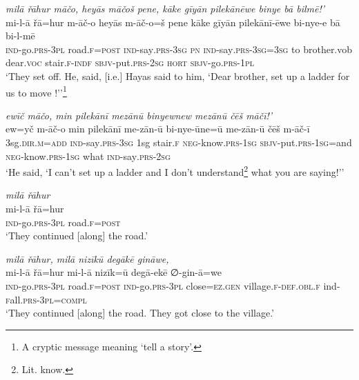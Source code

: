 \ea \label{ŽH.12}
\textit{milā řāhur māčo, heyās māčoš pene, kāke gīyān pilekānēwe binye bā bilmē!’} \\ 
\gll mi-l-ā řā=hur m-āč-o heyās m-āč-o=š pene kāke gīyān pilekānī-ēwe bi-nye-e bā bi-l-mē \\ 
 \textsc{ind-}go\textsc{.prs}\textsc{-3pl} road\textsc{\textsc{.f}}\textsc{=\textsc{post}} \textsc{ind-}say\textsc{.prs}\textsc{-3sg} \textsc{pn} \textsc{ind-}say\textsc{.prs}\textsc{-3sg}\textsc{=3sg} to brother.vob dear.\textsc{voc} stair\textsc{\textsc{.f}}\textsc{-indf} \textsc{sbjv-}put\textsc{.prs}-\textsc{2sg} \textsc{hort} \textsc{sbjv-}go\textsc{.prs}\textsc{-1pl} \\ 
\glt `They set off. He, said, [i.e.] Hayas said to him, ‘Dear brother, set up a ladder for us to move !’'\footnote{A cryptic message meaning ‘tell a story’.}
\z 
 
\ea \label{ŽH.13}
\textit{ewīč māčo, min pilekānī mezānū binyewnew mezānū čēš māčī!’} \\ 
\gll ew=yč m-āč-o min pilekānī me-zān-ū bi-nye-ūne=ū me-zān-ū čēš m-āč-ī \\ 
 3sg\textsc{.dir}\textsc{.m}\textsc{=add} \textsc{ind-}say\textsc{.prs}\textsc{-3sg} 1sg stair\textsc{\textsc{.f}} \textsc{neg-}know\textsc{.prs}\textsc{-1sg} \textsc{sbjv-}put\textsc{.prs}\textsc{-1sg}=and \textsc{neg-}know\textsc{.prs}\textsc{-1sg} what \textsc{ind-}say\textsc{.prs}-\textsc{2sg} \\ 
\glt `He said, ‘I can’t set up a ladder and I don’t understand\footnote{Lit. know.}  what you are saying!’'
\z 
 
\ea \label{ŽH.14}
\textit{milā řāhur} \\ 
\gll mi-l-ā řā=hur \\ 
 \textsc{ind-}go\textsc{.prs}\textsc{-3pl} road\textsc{\textsc{.f}}\textsc{=\textsc{post}} \\ 
\glt `They continued [along] the road.'
\z 
 
\ea \label{ŽH.15}
\textit{milā řāhur, milā nizīkū degākē gināwe,} \\ 
\gll mi-l-ā řā=hur mi-l-ā nizīk=ū degā-ekē ∅-gin-ā=we \\ 
 \textsc{ind-}go\textsc{.prs}\textsc{-3pl} road\textsc{\textsc{.f}}\textsc{=\textsc{post}} \textsc{ind-}go\textsc{.prs}\textsc{-3pl} close\textsc{=ez}\textsc{.gen} village\textsc{\textsc{.f}}\textsc{-def}\textsc{.obl}\textsc{\textsc{.f}} ind\textsc{-f}all\textsc{.prs}\textsc{-3pl}\textsc{=compl} \\ 
\glt `They continued [along] the road. They got close to the village.'
\z 
 
